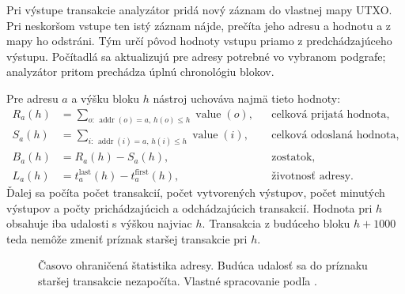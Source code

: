 Pri výstupe transakcie analyzátor pridá nový záznam do vlastnej mapy UTXO.
Pri neskoršom vstupe ten istý záznam nájde, prečíta jeho adresu a
hodnotu a z mapy ho odstráni. Tým určí pôvod hodnoty vstupu priamo z
predchádzajúceho výstupu. Počítadlá sa aktualizujú pre adresy potrebné
vo vybranom podgrafe; analyzátor pritom prechádza úplnú chronológiu
blokov.

Pre adresu $a$ a výšku bloku $h$ nástroj uchováva najmä tieto hodnoty:
\begin{align}
  R_a(h) &= \sum_{o:\,\operatorname{addr}(o)=a,\,h(o)\leq h}\operatorname{value}(o),
  &&\text{celková prijatá hodnota},\\
  S_a(h) &= \sum_{i:\,\operatorname{addr}(i)=a,\,h(i)\leq h}\operatorname{value}(i),
  &&\text{celková odoslaná hodnota},\\
  B_a(h) &= R_a(h)-S_a(h),
  &&\text{zostatok},\\
  L_a(h) &= t_a^{\mathrm{last}}(h)-t_a^{\mathrm{first}}(h),
  &&\text{životnosť adresy}.
  \label{eq:address-stats}
\end{align}
Ďalej sa počíta počet transakcií, počet vytvorených výstupov, počet
minutých výstupov a počty prichádzajúcich a odchádzajúcich transakcií.
Hodnota pri $h$ obsahuje iba udalosti s výškou najviac $h$. Transakcia
z budúceho bloku $h+1000$ teda nemôže zmeniť príznak staršej
transakcie pri $h$.

\begin{figure}[htbp]
  \centering
  \caption{Časovo ohraničená štatistika adresy. Budúca udalosť sa do
  príznaku staršej transakcie nezapočíta. Vlastné spracovanie podľa
  \cite{safar2026elliptic,bitcoinSubgraphBuilder}.}
  \label{fig:time-scoped-address-stat}
\end{figure}

